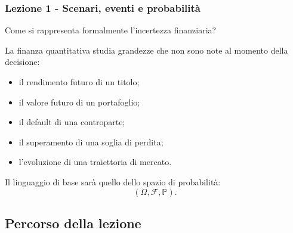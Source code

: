 \documentclass[handout]{beamer}%
\newenvironment{stepitemize}{\begin{itemize}[<+->]}{\end{itemize} }
\providecommand{\Prob}{\mathbb{P}}
\providecommand{\F}{\mathcal{F}}
\providecommand{\1}{\mathbf{1}}
\providecommand{\QTR}[2]{\csname #1\endcsname{#2}}
\begin{document}
\begin{frame}%
%

\frametitle{Lezione 1 - Scenari, eventi e probabilit\`{a}}%
%

%


\begin{center}
{\Large Come si rappresenta formalmente l'incertezza finanziaria?}
\end{center}

\medskip

La finanza quantitativa studia grandezze che non sono note al momento della decisione:

\begin{stepitemize}
\item il rendimento futuro di un titolo;

\item il valore futuro di un portafoglio;

\item il default di una controparte;

\item il superamento di una soglia di perdita;

\item l'evoluzione di una traiettoria di mercato.
\end{stepitemize}

\medskip

Il linguaggio di base sar\`{a} quello dello spazio di probabilit\`{a}:
\[
(\Omega,\F,\Prob).
\]
%

\transboxout
\end{frame}%




\subsection{Percorso della lezione}%
\end{document}
